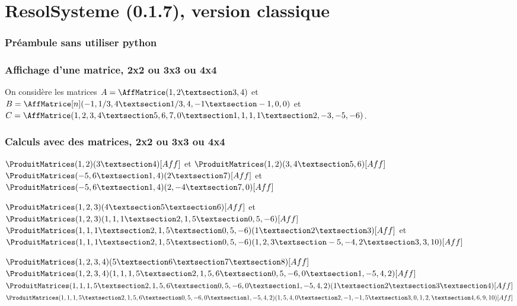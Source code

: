 \documentclass[french,a4paper,10pt]{article}
\def\RSver{0.1.7}
\begin{document}
\part*{ResolSysteme (\RSver), version \og classique \fg{}}

\section{Préambule sans utiliser python}


\section{Affichage d'une matrice, 2x2 ou 3x3 ou 4x4}

\begin{ShowCodeTeX}
On considère les matrices $A=\AffMatrice(1,2 § 3,4)$
et $B=\AffMatrice[n](-1,1/3,4 § 1/3,4,-1 § -1,0,0)$
et $C=\AffMatrice(1,2,3,4 § 5,6,7,0 § 1,1,1,1 § 2,-3,-5,-6)$.
\end{ShowCodeTeX}

\section{Calculs avec des matrices, 2x2 ou 3x3 ou 4x4}

\begin{ShowCodeTeX}
$\ProduitMatrices(1,2)(3 § 4)[Aff]$ et $\ProduitMatrices(1,2)(3,4 § 5,6)[Aff]$ \\
$\ProduitMatrices(-5,6 § 1,4)(2 § 7)[Aff]$ et $\ProduitMatrices(-5,6 § 1,4)(2,-4 § 7,0)[Aff]$
\end{ShowCodeTeX}

\begin{ShowCodeTeX}
$\ProduitMatrices(1,2,3)(4 § 5 § 6)[Aff]$ et $\ProduitMatrices(1,2,3)(1,1,1 § 2,1,5 § 0,5,-6)[Aff]$\\
$\ProduitMatrices(1,1,1 § 2,1,5 § 0,5,-6)(1 § 2 § 3)[Aff]$ et
$\ProduitMatrices(1,1,1 § 2,1,5 § 0,5,-6)(1,2,3 § -5,-4,2 § 3,3,10)[Aff]$
\end{ShowCodeTeX}

\begin{ShowCodeTeX}
$\ProduitMatrices(1,2,3,4)(5 § 6 § 7 § 8)[Aff]$\\
$\ProduitMatrices(1,2,3,4)(1,1,1,5 § 2,1,5,6 § 0,5,-6,0 § 1,-5,4,2)[Aff]$\\
$\ProduitMatrices(1,1,1,5 § 2,1,5,6 § 0,5,-6,0 § 1,-5,4,2)(1 § 2 § 3 § 4)[Aff]$\\
$\ProduitMatrices(1,1,1,5 § 2,1,5,6 § 0,5,-6,0 § 1,-5,4,2)(1,5,4,0 § 2,-1,-1,5 § 3,0,1,2, § 4,6,9,10)[Aff]$
\end{ShowCodeTeX}
\end{document}
